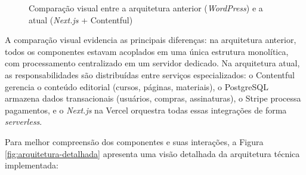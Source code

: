 \begin{figure}[htb]
\caption{Comparação visual entre a arquitetura anterior (\textit{WordPress}) e a atual (\textit{Next.js} + Contentful)}
\label{fig:comparativo-arquiteturas}
\end{figure}

A comparação visual evidencia as principais diferenças: na arquitetura anterior, todos os componentes estavam acoplados em uma única estrutura monolítica, com processamento centralizado em um servidor dedicado. Na arquitetura atual, as responsabilidades são distribuídas entre serviços especializados: o Contentful gerencia o conteúdo editorial (cursos, páginas, materiais), o PostgreSQL armazena dados transacionais (usuários, compras, assinaturas), o Stripe processa pagamentos, e o \textit{Next.js} na Vercel orquestra todas essas integrações de forma \textit{serverless}.

Para melhor compreensão dos componentes e suas interações, a Figura \ref{fig:arquitetura-detalhada} apresenta uma visão detalhada da arquitetura técnica implementada:

